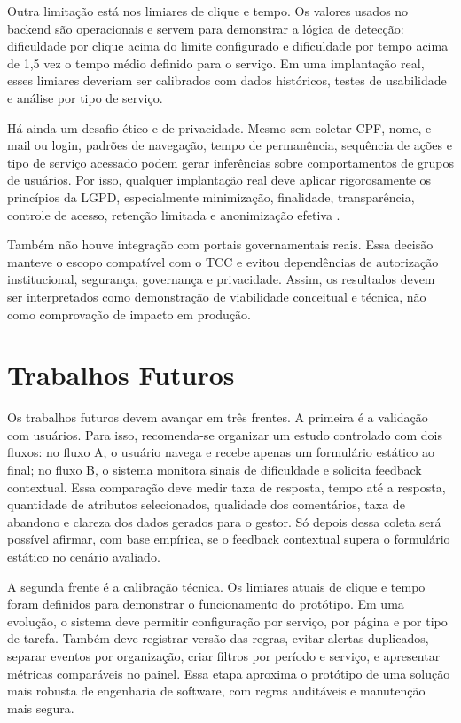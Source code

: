 Outra limitação está nos limiares de clique e tempo. Os valores usados no
backend são operacionais e servem para demonstrar a lógica de detecção:
dificuldade por clique acima do limite configurado e dificuldade por tempo acima
de 1,5 vez o tempo médio definido para o serviço. Em uma implantação real, esses
limiares deveriam ser calibrados com dados históricos, testes de usabilidade e
análise por tipo de serviço.

Há ainda um desafio ético e de privacidade. Mesmo sem coletar CPF, nome, e-mail
ou login, padrões de navegação, tempo de permanência, sequência de ações e tipo
de serviço acessado podem gerar inferências sobre comportamentos de grupos de
usuários. Por isso, qualquer implantação real deve aplicar rigorosamente os
princípios da LGPD, especialmente minimização, finalidade, transparência,
controle de acesso, retenção limitada e anonimização efetiva \cite{brasil2018lgpd}.

Também não houve integração com portais governamentais reais. Essa decisão
manteve o escopo compatível com o TCC e evitou dependências de autorização
institucional, segurança, governança e privacidade. Assim, os resultados devem
ser interpretados como demonstração de viabilidade conceitual e técnica, não como
comprovação de impacto em produção.

\section{Trabalhos Futuros}

Os trabalhos futuros devem avançar em três frentes. A primeira é a validação com
usuários. Para isso, recomenda-se organizar um estudo controlado com dois fluxos:
no fluxo A, o usuário navega e recebe apenas um formulário estático ao final; no
fluxo B, o sistema monitora sinais de dificuldade e solicita feedback contextual.
Essa comparação deve medir taxa de resposta, tempo até a resposta, quantidade de
atributos selecionados, qualidade dos comentários, taxa de abandono e clareza dos
dados gerados para o gestor. Só depois dessa coleta será possível afirmar, com
base empírica, se o feedback contextual supera o formulário estático no cenário
avaliado.

A segunda frente é a calibração técnica. Os limiares atuais de clique e tempo
foram definidos para demonstrar o funcionamento do protótipo. Em uma evolução, o
sistema deve permitir configuração por serviço, por página e por tipo de tarefa.
Também deve registrar versão das regras, evitar alertas duplicados, separar
eventos por organização, criar filtros por período e serviço, e apresentar
métricas comparáveis no painel. Essa etapa aproxima o protótipo de uma solução
mais robusta de engenharia de software, com regras auditáveis e manutenção mais
segura.

